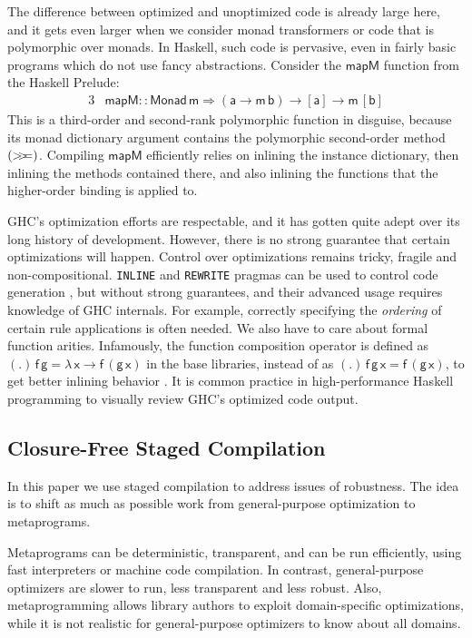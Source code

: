 \documentclass[acmsmall,screen,review,anonymous]{acmart}
\newcommand{\msf}[1]{{\mathsf{#1}}}
\newcommand{\lam}{\lambda\,}
\newcommand{\vm}{\mathsf{m}}
\newcommand{\va}{\mathsf{a}}
\newcommand{\vb}{\mathsf{b}}
\newcommand{\vx}{\mathsf{x}}
\newcommand{\vf}{\mathsf{f}}
\newcommand{\vg}{\mathsf{g}}
\newcommand{\Monad}{\msf{Monad}}
\newcommand{\bind}{\mathbin{>\!\!>\mkern-6.7mu=}}
\theoremstyle{remark}
\begin{document}
The difference between optimized and unoptimized code is already large here, and
it gets even larger when we consider monad transformers or code that is
polymorphic over monads. In Haskell, such code is pervasive, even in fairly
basic programs which do not use fancy abstractions. Consider the $\msf{mapM}$
function from the Haskell Prelude:
\begin{alignat*}{3}
  & \msf{mapM} :: \Monad\,\vm \Rightarrow (\va \to \vm\,\vb) \to [\va] \to \vm\,[\vb]
\end{alignat*}
This is a third-order and second-rank polymorphic function in disguise, because
its monad dictionary argument contains the polymorphic second-order method
$(\bind)$.  Compiling $\msf{mapM}$ efficiently relies on inlining the instance
dictionary, then inlining the methods contained there, and also inlining the
functions that the higher-order binding is applied to.

GHC's optimization efforts are respectable, and it has gotten quite adept over
its long history of development. However, there is no strong guarantee that
certain optimizations will happen. Control over optimizations remains tricky,
fragile and non-compositional. \texttt{INLINE} and \texttt{REWRITE} pragmas can
be used to control code generation \cite{ghcdocs}, but without strong
guarantees, and their advanced usage requires knowledge of GHC internals. For
example, correctly specifying the \emph{ordering} of certain rule applications
is often needed. We also have to care about formal function arities. Infamously,
the function composition operator is defined as $(.)\,\vf\,\vg = \lam \vx \to
\vf\,(\vg\,\vx)$ in the base libraries, instead of as $(.)\,\vf\,\vg\,\vx =
\vf\,(\vg\,\vx)$, to get better inlining behavior \cite{ghcbase}. It is common
practice in high-performance Haskell programming to visually review GHC's
optimized code output.

\subsection{Closure-Free Staged Compilation}

In this paper we use staged compilation to address issues of robustness. The
idea is to shift as much as possible work from general-purpose optimization to
metaprograms.

Metaprograms can be deterministic, transparent, and can be run efficiently,
using fast interpreters or machine code compilation. In contrast,
general-purpose optimizers are slower to run, less transparent and less
robust. Also, metaprogramming allows library authors to exploit
domain-specific optimizations, while it is not realistic for general-purpose
optimizers to know about all domains.
\end{document}

